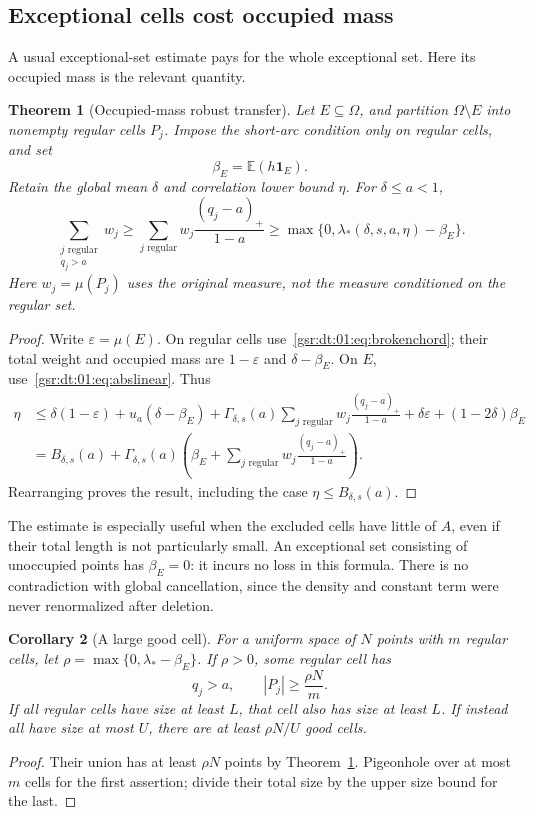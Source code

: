 \documentclass[11pt,letterpaper]{article}
\numberwithin{equation}{section}
\newtheorem{theorem}{Theorem}[section]
\newtheorem{corollary}[theorem]{Corollary}
\theoremstyle{definition}
\theoremstyle{remark}
\newcommand{\E}{\mathbb E}
\newcommand{\one}{\mathbf 1}
\newcommand{\1}{\mathbf 1}
\newcommand{\pos}[1]{\left(#1\right)_{+}}
\newcommand{\BB}{B_{\delta,s}}
\newcommand{\GG}{\Gamma_{\delta,s}}
\begin{document}
\subsection{Exceptional cells cost occupied mass}
A usual exceptional-set estimate pays for the whole exceptional set.
Here its occupied mass is the relevant quantity.

\begin{theorem}[Occupied-mass robust transfer]\label{gsr:dt:01:thm:exception}
Let $E\subseteq\Omega$, and partition $\Omega\setminus E$ into nonempty
regular cells $P_j$. Impose the short-arc condition only on regular cells,
and set
\[
 \beta_E=\E(h\one_E).
\]
Retain the global mean $\delta$ and correlation lower bound $\eta$.
For $\delta\le a<1$,
\begin{equation}\label{gsr:dt:01:eq:exception}
 \sum_{\substack{j\text{ regular}\\q_j>a}}w_j
 \ge\sum_{j\text{ regular}}w_j\frac{\pos{q_j-a}}{1-a}
 \ge\max\{0,\lambda_*(\delta,s,a,\eta)-\beta_E\}.
\end{equation}
Here $w_j=\mu(P_j)$ uses the original measure, not the measure conditioned
on the regular set.
\end{theorem}
\begin{proof}
Write $\varepsilon=\mu(E)$. On regular cells use~\eqref{gsr:dt:01:eq:brokenchord};
their total weight and occupied mass are $1-\varepsilon$ and
$\delta-\beta_E$. On $E$, use~\eqref{gsr:dt:01:eq:abslinear}. Thus
\begin{align*}
 \eta
 &\le\delta(1-\varepsilon)+u_a(\delta-\beta_E)
   +\GG(a)\sum_{j\text{ regular}}w_j\frac{\pos{q_j-a}}{1-a}
   +\delta\varepsilon+(1-2\delta)\beta_E\\
 &=\BB(a)+\GG(a)\left(\beta_E+
       \sum_{j\text{ regular}}w_j\frac{\pos{q_j-a}}{1-a}\right).
\end{align*}
Rearranging proves the result, including the case $\eta\le\BB(a)$.
\end{proof}

The estimate is especially useful when the excluded cells have little of
$A$, even if their total length is not particularly small. An exceptional
set consisting of unoccupied points has $\beta_E=0$: it incurs no loss
in this formula. There is no contradiction with global cancellation,
since the density and constant term were never renormalized after deletion.

\begin{corollary}[A large good cell]\label{gsr:dt:01:cor:largecell}
For a uniform space of $N$ points with $m$ regular cells, let
$\rho=\max\{0,\lambda_* -\beta_E\}$. If $\rho>0$, some regular cell has
\[
 q_j>a,\qquad |P_j|\ge\frac{\rho N}{m}.
\]
If all regular cells have size at least $L$, that cell also has size at
least $L$. If instead all have size at most $U$, there are at least
$\rho N/U$ good cells.
\end{corollary}
\begin{proof}
Their union has at least $\rho N$ points by Theorem~\ref{gsr:dt:01:thm:exception}.
Pigeonhole over at most $m$ cells for the first assertion; divide their
total size by the upper size bound for the last.
\end{proof}
\end{document}
